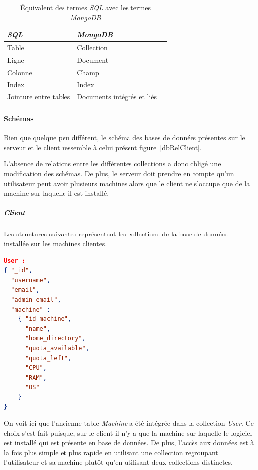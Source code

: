 \documentclass[a4paper,10pt, twoside]{report}
\begin{document}
\begin{spacing}{1.2}
\begin{table}[h!]
  \centering
  \def\arraystretch{1.5}
  \setlength{\fboxsep}{13pt} %
  \setlength{\fboxrule}{0pt} %
  \begin{tabular}{lm{6cm}m{6cm}}
   \rowcolor{arkred} 
    \arrayrulecolor{gray73}\hline
    \color{white} \textbf{\textit{SQL}} &
    \color{white} \textbf{\textit{MongoDB}}\\
    \hline
    Table & Collection\\
    \hline
    Ligne & Document\\
    \hline
    Colonne & Champ\\
    \hline
    Index & Index\\
    \hline
    Jointure entre tables & Documents int\'egr\'es et li\'es
  \end{tabular}
  \caption{\label{tabMappSQLMongoTerms} \'Equivalent des termes \textit{SQL}
  avec les termes \textit{MongoDB}}
\end{table}

\paragraph{Sch\'emas}
Bien que quelque peu diff\'erent, le sch\'ema des bases de donn\'ees
pr\'esentes sur le serveur et le client ressemble \`a celui pr\'esent
figure~\ref{dbRelClient}.

L'absence de relations entre les diff\'erentes collections a donc oblig\'e une
modification des sch\'emas. De plus, le serveur doit prendre en compte qu'un
utilisateur peut avoir plusieurs machines alors que le client ne s'occupe que
de la machine sur laquelle il est install\'e.

\subparagraph{Client\\}
Les structures suivantes repr\'esentent les collections de la base de donn\'ees
install\'ee sur les machines clientes.

\begin{lstlisting}[language=json]
User :
{ "_id",
  "username",
  "email",
  "admin_email",
  "machine" :
    { "id_machine",
      "name",
      "home_directory",
      "quota_available",
      "quota_left",
      "CPU",
      "RAM",
      "OS"
    }
}
\end{lstlisting}

On voit ici que l'ancienne table \textit{Machine} a \'et\'e int\'egr\'ee dans
la collection \textit{User}. Ce choix s'est fait puisque, sur le client
il n'y a que la machine sur laquelle le logiciel est install\'e qui est
pr\'esente en base de donn\'ees. De plus, l'acc\`es aux donn\'ees est \`a la
fois plus simple et plus rapide en utilisant une collection regroupant
l'utilisateur et sa machine plut\^ot qu'en utilisant deux collections
distinctes.


\end{spacing}
\end{document}
